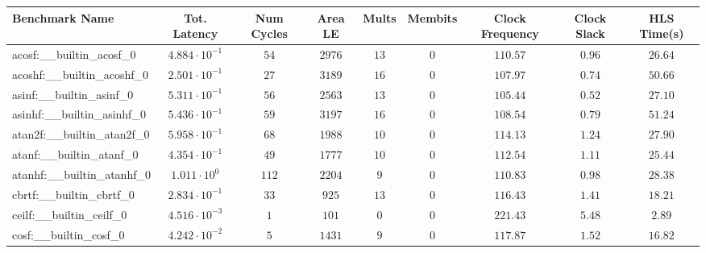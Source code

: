 \begin{tabular}{|l|c|c|c|c|c|c|c|c|}
\hline
Benchmark Name                            & Tot. Latency            & Num Cycles & Area LE   & Mults   & Membits & Clock Frequency & Clock Slack & HLS Time(s) \\
\hline
acosf:\_\_builtin\_acosf\_0               & $ 4.884 \cdot 10^{-1} $ & $ 54     $ & $ 2976  $ & $ 13  $ & $ 0   $ & $ 110.57      $ & $ 0.96    $ & $ 26.64   $ \\
acoshf:\_\_builtin\_acoshf\_0             & $ 2.501 \cdot 10^{-1} $ & $ 27     $ & $ 3189  $ & $ 16  $ & $ 0   $ & $ 107.97      $ & $ 0.74    $ & $ 50.66   $ \\
asinf:\_\_builtin\_asinf\_0               & $ 5.311 \cdot 10^{-1} $ & $ 56     $ & $ 2563  $ & $ 13  $ & $ 0   $ & $ 105.44      $ & $ 0.52    $ & $ 27.10   $ \\
asinhf:\_\_builtin\_asinhf\_0             & $ 5.436 \cdot 10^{-1} $ & $ 59     $ & $ 3197  $ & $ 16  $ & $ 0   $ & $ 108.54      $ & $ 0.79    $ & $ 51.24   $ \\
atan2f:\_\_builtin\_atan2f\_0             & $ 5.958 \cdot 10^{-1} $ & $ 68     $ & $ 1988  $ & $ 10  $ & $ 0   $ & $ 114.13      $ & $ 1.24    $ & $ 27.90   $ \\
atanf:\_\_builtin\_atanf\_0               & $ 4.354 \cdot 10^{-1} $ & $ 49     $ & $ 1777  $ & $ 10  $ & $ 0   $ & $ 112.54      $ & $ 1.11    $ & $ 25.44   $ \\
atanhf:\_\_builtin\_atanhf\_0             & $ 1.011 \cdot 10^{0}  $ & $ 112    $ & $ 2204  $ & $ 9   $ & $ 0   $ & $ 110.83      $ & $ 0.98    $ & $ 28.38   $ \\
cbrtf:\_\_builtin\_cbrtf\_0               & $ 2.834 \cdot 10^{-1} $ & $ 33     $ & $ 925   $ & $ 13  $ & $ 0   $ & $ 116.43      $ & $ 1.41    $ & $ 18.21   $ \\
ceilf:\_\_builtin\_ceilf\_0               & $ 4.516 \cdot 10^{-3} $ & $ 1      $ & $ 101   $ & $ 0   $ & $ 0   $ & $ 221.43      $ & $ 5.48    $ & $ 2.89    $ \\
cosf:\_\_builtin\_cosf\_0                 & $ 4.242 \cdot 10^{-2} $ & $ 5      $ & $ 1431  $ & $ 9   $ & $ 0   $ & $ 117.87      $ & $ 1.52    $ & $ 16.82   $ \\

\end{tabular}
